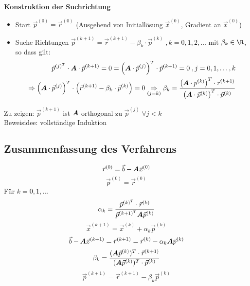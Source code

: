 \textbf{Konstruktion der Suchrichtung}
\begin{itemize}
\item Start $\vec{p}^{(0)} = \vec{r}^{(0)}$ (Ausgehend von Initiallösung $\vec{x}^{(0)}$, Gradient an $\vec{x}^{(0)}$)
\item Suche Richtungen $\vec{p}^{(k+1)} = \vec{r}^{(k+1)} - \beta_k\cdot\vec{p}^{(k)}\;,k=0,1,2,\ldots$ mit $\beta_k\in\R$, so dass gilt:
\begin{align}
\vec{p}^{{(j)}^T}\cdot\boldsymbol {A}\cdot\vec{p}^{(k+1)} = 0 = {\left(\boldsymbol {A}\cdot\vec{p}^{(j)}\right)}^T\cdot\vec{p}^{(k+1)} = 0\;,j=0,1,\ldots,k\\
\Rightarrow {\left(\ensuremath{\boldsymbol {A}}\cdot\vec{p}^{(j)}\right)}^T\cdot\left(\vec{r}^{(k+1)}-\beta_k\cdot\vec{p}^{(k)}\right) = 0 \underset{(j=k)}{\Rightarrow}\beta_k = \frac{\left(\boldsymbol {A}\cdot\vec{p}^{(k)}\right)^T\cdot\vec{r}^{(k+1)}}{\left(\boldsymbol {A}\cdot\vec{p}^{(k)}\right)^T\cdot\vec{p}^{(k)}}
\end{align}
\end{itemize}
Zu zeigen: $\vec{p}^{(k+1)}$ ist $\boldsymbol {A}$ orthogonal zu $\vec{p}^{(j)}\;\forall j<k$\\
Beweisidee: vollständige Induktion

\subsection{Zusammenfassung des Verfahrens}
\begin{equation}
	\vec{r}^{(0)} = \vec{b} - \boldsymbol {A} \vec{x}^{(0)}
\end{equation}
\begin{equation}
	\vec{p}^{(0)} = \vec{r}^{(0)}
\end{equation}
Für $k = 0, 1, \ldots$
\begin{equation}
	\alpha_k = \frac{\vec{p}^{{(k)}^T} \cdot \vec{r}^{(k)}}{\vec{p}^{{(k + 1)}^T} \boldsymbol {A} \vec{p}^{(k)}}
\end{equation}
\begin{equation}
	\vec{x}^{(k + 1)} = \vec{x}^{(k)} + \alpha_k \vec{p}^{(k)}
\end{equation}
\begin{equation}
	\vec{b} - \boldsymbol {A} \vec{x}^{(k + 1)} = \vec{r}^{(k + 1)} = \vec{r}^{(k)} - \alpha_k \boldsymbol {A} \vec{p}^{(k)}
\end{equation}
\begin{equation}
	\beta_k = \frac{(\boldsymbol {A} \vec{p}^{(k)})^T \cdot \vec{r}^{(k + 1)}}{(\boldsymbol {A} \vec{p}^{(k)})^T \cdot \vec{p}^{(k)}}
\end{equation}
\begin{equation}
	\vec{p}^{(k + 1)} = \vec{r}^{(k + 1)} - \beta_k \vec{p}^{(k)}
\end{equation}

